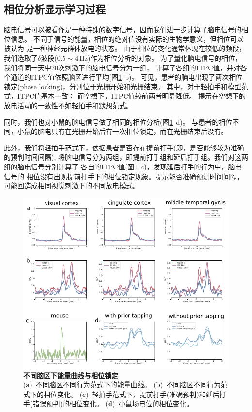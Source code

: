 \subsection{相位分析显示学习过程}
脑电信号可以被看作是一种特殊的数字信号，因而我们进一步计算了脑电信号的相位信息。
不同于信号的能量，相位的绝对值没有实际的生物学意义，但相位可以被认为
是一种神经元群体放电的状态\cite{gu2010phase}。
由于相位的变化通常体现在较低的频段，我们选取了\(\delta\)波段(\(0.5 \sim 4\ \text{Hz}\))作为相位分析的对象。
为了量化脑电信号的相位，我们将同一天中20次刺激下的脑电信号分为一组，
计算了各组的ITPC值，并对各个通道的ITPC值依照脑区进行平均(图\ref{fig:ephys_network}~b)。
可见，患者的脑电出现了两次相位锁定(phase locking)，分别位于光栅开始和光栅结束。
其中，对于轻拍手和模型范式，ITPC值基本一致；
而空想下，ITPC值较前两者明显降低。%
提示在空想下的放电活动的一致性不如轻拍手和默想范式。

同时，我们也对小鼠的脑电信号做了相同的相位分析(图\ref{fig:ephys_network}~d)。
与患者的相位不同，小鼠的脑电只有在光栅开始后有一次相位锁定，而在光栅结束后没有。

此外，我们将轻拍手范式下，依据患者是否存在提前打手(即，是否能够较为准确的预判时间间隔),
将脑电信号分为两组，即提前打手组和延后打手组。我们对这两组的脑电信号分别计算了
各自的ITPC值(图\ref{fig:ephys_network}~c)，发现延后打手的行为中，脑电信号的
相位没有出现提前打手下的相位锁定现象。提示能否准确预测时间间隔，
可能回造成相同视觉刺激下的不同放电模式。

\begin{figure}[h]
    \centering
    \includegraphics[width=\textwidth]{src/figures/ephys_network.pdf}
    \caption{\textbf{不同脑区下能量曲线与相位锁定}\\
    (\textbf{a})~不同脑区不同行为范式下的能量曲线。
    (\textbf{b})~不同脑区不同行为范式下的相位变化。
    (\textbf{c})~轻拍手范式下，提前打手(准确预判)和延后打手(错误预判)的相位变化。
    (\textbf{d})~小鼠场电位的相位变化。}
    \label{fig:ephys_network}
\end{figure}

